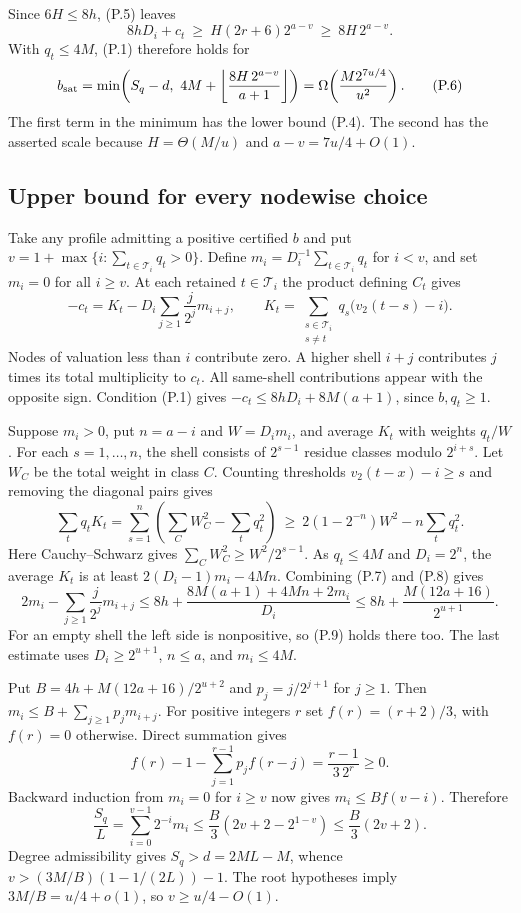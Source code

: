 \documentclass[
  11pt,
]{article}
\begin{document}
Since \(6H\le8h\), (P.5) leaves \[
 8hD_i+c_t\ \ge\ H(2r+6)2^{a-v}\ \ge\ 8H\,2^{a-v}.
\] With \(q_t\le4M\), (P.1) therefore holds for \[
 b_{\rm sat}=\min\!\left(S_q-d,\ 4M+
       \left\lfloor\frac{8H\,2^{a-v}}{a+1}\right\rfloor\right)
       =\Omega\!\left(\frac{M2^{7u/4}}{u^2}\right).         \tag{P.6}
\] The first term in the minimum has the lower bound (P.4). The second
has the asserted scale because \(H=\Theta(M/u)\) and \(a-v=7u/4+O(1)\).

\subsection{Upper bound for every nodewise
choice}\label{upper-bound-for-every-nodewise-choice}

Take any profile admitting a positive certified \(b\) and put
\(v=1+\max\{i:\sum_{t\in\mathcal T_i}q_t>0\}\). Define
\(m_i=D_i^{-1}\sum_{t\in\mathcal T_i}q_t\) for \(i<v\), and set
\(m_i=0\) for all \(i\ge v\). At each retained \(t\in\mathcal T_i\) the
product defining \(C_t\) gives \[
 -c_t=K_t-D_i\sum_{j\ge1}\frac j{2^j}m_{i+j},\qquad
 K_t=\sum_{\substack{s\in\mathcal T_i\\s\ne t}}
                   q_s\big(v_2(t-s)-i\big).                 \tag{P.7}
\] Nodes of valuation less than \(i\) contribute zero. A higher shell
\(i+j\) contributes \(j\) times its total multiplicity to \(c_t\). All
same-shell contributions appear with the opposite sign. Condition (P.1)
gives \(-c_t\le8hD_i+8M(a+1)\), since \(b,q_t\ge1\).

Suppose \(m_i>0\), put \(n=a-i\) and \(W=D_i m_i\), and average \(K_t\)
with weights \(q_t/W\). For each \(s=1,\ldots,n\), the shell consists of
\(2^{s-1}\) residue classes modulo \(2^{i+s}\). Let \(W_C\) be the total
weight in class \(C\). Counting thresholds \(v_2(t-x)-i\ge s\) and
removing the diagonal pairs gives \[
 \sum_t q_t K_t
 =\sum_{s=1}^n\left(\sum_C W_C^2-\sum_t q_t^2\right)
 \ \ge\ 2(1-2^{-n})W^2-n\sum_tq_t^2.                     \tag{P.8}
\] Here Cauchy--Schwarz gives \(\sum_C W_C^2\ge W^2/2^{s-1}\). As
\(q_t\le4M\) and \(D_i=2^n\), the average \(K_t\) is at least
\(2(D_i-1)m_i-4Mn\). Combining (P.7) and (P.8) gives \[
 2m_i-\sum_{j\ge1}\frac j{2^j}m_{i+j}
 \le 8h+\frac{8M(a+1)+4Mn+2m_i}{D_i}
 \le 8h+\frac{M(12a+16)}{2^{u+1}} .                        \tag{P.9}
\] For an empty shell the left side is nonpositive, so (P.9) holds there
too. The last estimate uses \(D_i\ge 2^{u+1}\), \(n\le a\), and
\(m_i\le4M\).

Put \(B=4h+M(12a+16)/2^{u+2}\) and \(p_j=j/2^{j+1}\) for \(j\ge1\). Then
\(m_i\le B+\sum_{j\ge1}p_jm_{i+j}\). For positive integers \(r\) set
\(f(r)=(r+2)/3\), with \(f(r)=0\) otherwise. Direct summation gives \[
 f(r)-1-\sum_{j=1}^{r-1}p_j f(r-j)=\frac{r-1}{3\,2^r}\ge0 .
\] Backward induction from \(m_i=0\) for \(i\ge v\) now gives
\(m_i\le Bf(v-i)\). Therefore \[
 \frac{S_q}{L}=\sum_{i=0}^{v-1}2^{-i}m_i
 \le \frac B3(2v+2-2^{1-v})\le\frac B3(2v+2).
\] Degree admissibility gives \(S_q>d=2ML-M\), whence
\(v>(3M/B)(1-1/(2L))-1\). The root hypotheses imply \(3M/B=u/4+o(1)\),
so \(v\ge u/4-O(1)\).
\end{document}
